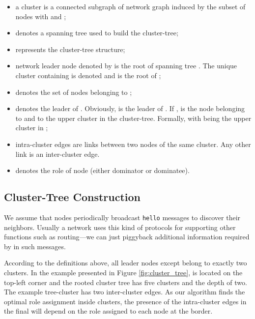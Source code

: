 \documentclass[twoside]{article}
\begin{document}
\begin{itemize}
\item a cluster is a connected subgraph  of network graph
   induced by the subset of nodes  with
   and ;
	
	\item  denotes a spanning tree used to build the cluster-tree;
	
	\item  represents the cluster-tree structure; 
	
	\item network leader node denoted by  is the
          root of spanning tree . The unique cluster containing
           is denoted  and is the root of
          ;
	
	\item  denotes the set of nodes belonging to ;
		
	\item  denotes the leader of . Obviously,  is the leader of . If ,  is the node belonging to  and to the upper cluster in the cluster-tree. Formally,  with  being the upper cluster in ;
	
	\item intra-cluster edges are links between two nodes of the
          same cluster. Any other link is an inter-cluster edge.
	
	\item  denotes the role of node  (either dominator
          or dominatee). 
\end{itemize}

\subsection{Cluster-Tree Construction}

We assume that nodes periodically broadcast
\texttt{hello} messages to discover their neighbors. Usually a network
uses this kind of protocols for supporting other functions
such as routing---we can just piggyback additional information
required by \potatoes in such messages. 

According to the definitions above, all leader nodes except
 belong to exactly two clusters. In the example presented
in Figure \ref{fig:cluster_tree},  is located on the
top-left corner and the rooted cluster tree has five clusters and the
depth of two. The example tree-cluster has two inter-cluster edges.
As our algorithm finds the optimal role assignment inside clusters,
the presence of the intra-cluster edges in the final \rwcds will
depend on the role assigned to each node at the border.
\end{document}
